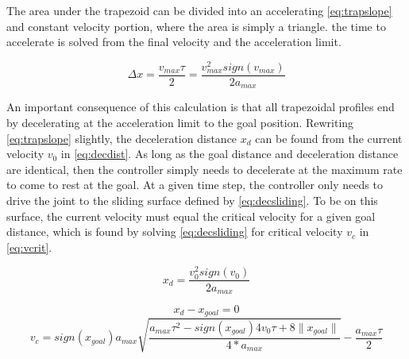 The area under the trapezoid can be divided into an accelerating
\eqref{eq:trapslope} and constant velocity portion, where the area is simply a triangle. the time to accelerate is
solved from the final velocity and the acceleration limit.

\begin{equation}
\label{eq:trapslope}
\Delta x=\frac{v_{max}\tau}{2}=\frac{v_{max}^2 sign(v_{max})}{2a_{max}}
\end{equation}

An important consequence of this calculation is that all trapezoidal profiles
end by decelerating at the acceleration limit to the goal position. Rewriting
\eqref{eq:trapslope} slightly, the deceleration distance $x_d$ can be found
from the current velocity $v_0$ in \eqref{eq:decdist}. As long as the goal
distance and deceleration distance are identical, then the controller simply
needs to decelerate at the maximum rate to come to rest at the goal. At a given
time step, the controller only needs to drive the joint to the sliding surface defined by \eqref{eq:decsliding}. To be on this surface, the current velocity must equal the critical velocity for a given goal distance, which is found by solving \eqref{eq:decsliding} for critical velocity $v_c$ in \eqref{eq:vcrit}.

\begin{equation}
\label{eq:decdist}
x_d=\frac{v_0^2 sign(v_0)}{2a_{max}}
\end{equation}

\begin{equation}
\label{eq:decsliding}
x_d-x_{goal}=0
\end{equation}
\begin{equation}
\label{eq:vcrit}
v_c=sign(x_{goal}) a_{max} \sqrt{\frac{a_{max} \tau^2-sign(x_{goal}) 4 v_0 \tau+8 \|x_{goal}\|}{4*a_{max}}} - \frac{a_{max} \tau }{2}
\end{equation}


